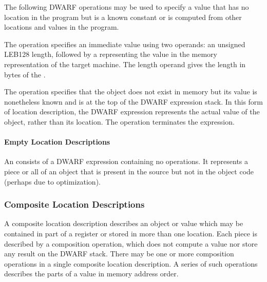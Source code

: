 The following DWARF operations may be used to specify a value
that has no location in the program but is a known constant
or is computed from other locations and values in the program.
\begin{enumerate}[1. ]
The  
operation specifies an immediate value
using two operands: an unsigned LEB128 length, followed by
a  representing the value in the memory representation
of the target machine. The length operand gives the length
in bytes of the .

The  
operation specifies that the object
does not exist in memory but its value is nonetheless known
and is at the top of the DWARF expression stack. In this form
of location description, the DWARF expression represents the
actual value of the object, rather than its location. The
 operation terminates the expression.
\end{enumerate}


\paragraph{Empty Location Descriptions}

An 
consists of a DWARF expression
containing no operations. It represents a piece or all of an
object that is present in the source but not in the object code
(perhaps due to optimization).

\subsubsection{Composite Location Descriptions}
A composite location description describes an object or
value which may be contained in part of a register or stored
in more than one location. Each piece is described by a
composition operation, which does not compute a value nor
store any result on the DWARF stack. There may be one or
more composition operations in a single composite location
description. A series of such operations describes the parts
of a value in memory address order.

